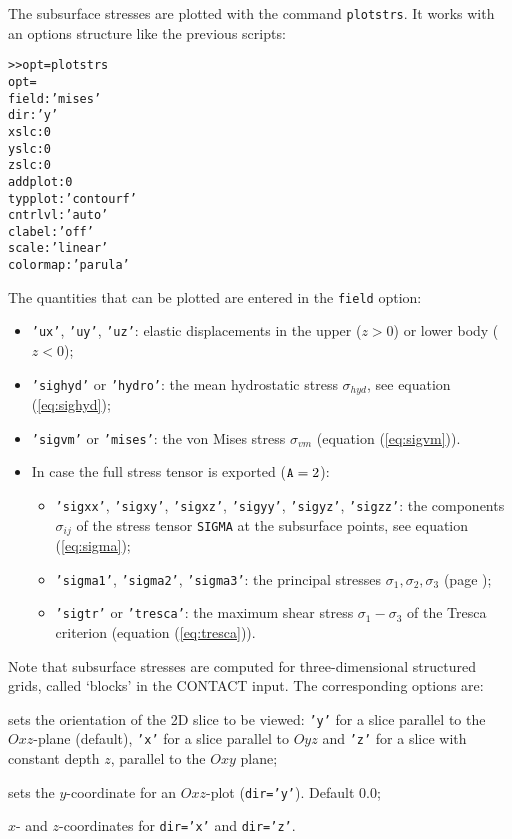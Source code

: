 \documentclass[12pt]{report}
\begin{document}
The subsurface stresses are plotted with the command {\tt plotstrs}. It
works with an options structure like the previous scripts:
\begin{alltt}\small
>> opt=plotstrs
opt =
       field: 'mises'
         dir: 'y'
        xslc: 0
        yslc: 0
        zslc: 0
     addplot: 0
     typplot: 'contourf'
     cntrlvl: 'auto'
      clabel: 'off'
       scale: 'linear'
    colormap: 'parula'
\end{alltt}
The quantities that can be plotted are entered in the {\tt field} option:
\begin{itemize}
\item {\tt 'ux'}, {\tt 'uy'}, {\tt 'uz'}: elastic displacements in the upper
        ($z>0$) or lower body ($z<0$);
\item {\tt 'sighyd'} or {\tt 'hydro'}: the mean hydrostatic stress
        $\sigma_{hyd}$, see equation (\ref{eq:sighyd});
\item {\tt 'sigvm'} or {\tt 'mises'}: the von Mises stress $\sigma_{vm}$
        (equation (\ref{eq:sigvm})).
\item In case the full stress tensor is exported (${\tt A}=2$):
\begin{itemize}
\item {\tt 'sigxx'}, {\tt 'sigxy'}, {\tt 'sigxz'}, {\tt 'sigyy'}, 
      {\tt 'sigyz'}, {\tt 'sigzz'}: the components $\sigma_{ij}$ of the 
      stress tensor {\tt SIGMA} at the subsurface points, see equation
        (\ref{eq:sigma});
\item {\tt 'sigma1'}, {\tt 'sigma2'}, {\tt 'sigma3'}: the principal
      stresses $\sigma_1, \sigma_2, \sigma_3$ (page \pageref{page:sigmaj});
\item {\tt 'sigtr'} or {\tt 'tresca'}: the maximum shear stress
        $\sigma_1-\sigma_3$ of the Tresca criterion (equation
        (\ref{eq:tresca})).
\end{itemize}
\end{itemize}
Note that subsurface stresses are computed for three-dimensional
structured grids, called `blocks' in the CONTACT input. The corresponding
options are:
\begin{description}[leftmargin=6em,style=nextline]
\item[dir]   sets the orientation of the 2D slice to be viewed: {\tt 'y'}
        for a slice parallel to the $Oxz$-plane (default), {\tt 'x'} for a
        slice parallel to $Oyz$ and {\tt 'z'} for a slice with constant
        depth $z$, parallel to the $Oxy$ plane;
\item[yslc]  sets the $y$-coordinate for an $Oxz$-plot ({\tt dir='y'}).
        Default 0.0;
\item[xslc, zslc] $x$- and $z$-coordinates for {\tt dir='x'} and {\tt dir='z'}.
\end{description}
\end{document}
